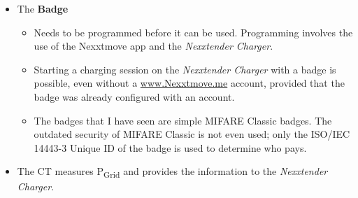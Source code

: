 \documentclass[a4paper]{article}
\begin{document}
\begin{itemize}
\begin{itemize}
\begin{itemize}
	      	      	\item
	      	      	      Requires an account
	      	      	\item
	      	      	      Controls the Nexxtmove app which in turn controls the
	      	      	      \emph{Nexxtender Charger}.
	      	      	\item
	      	      	      Receives all information about charging events on the
	      	      	      \emph{Nexxtender Charger}.
	      	      	\item
	      	      	      If the \emph{Nexxtender Charger} is provided by an employer to an employee, 
	      	      	      \href{http://www.nexttmove.me/}{www.Nexxtmove.me}
	      	      	      controls the refunding of the employee by the employer.
	      	      	\item
	      	      	      Several providers of chargers rebrand this website. 
	      	      	      For instance if your employer provided you with a \emph{Nexxtender Charger} via Q8, 
	      	      	      the Q8 electric website is actually \href{http://www.nexttmove.me/}{www.Nexxtmove.me}.
	      	      \end{itemize}
	      	\item
	      	      The \textbf{Badge}
	      	      
	      	      \begin{itemize}
	      	      	    
	      	      	\item
	      	      	      Needs to be programmed before it can be used. 
	      	      	      Programming involves the use of the Nexxtmove app and the \emph{Nexxtender Charger}.
	      	      	\item
	      	      	      Starting a charging session on the \emph{Nexxtender Charger}
	      	      	      with a badge is possible, 
	      	      	      even without a \href{http://www.Nexxtmove.me/}{www.Nexxtmove.me} account,
	      	      	      provided that the badge was already configured with an account.
	      	      	\item
	      	      	      The badges that I have seen are simple MIFARE Classic badges. 
	      	      	      The outdated security of MIFARE Classic is not even used; 
	      	      	      only the ISO/IEC 14443-3 Unique ID of the badge is used to determine who pays.
	      	      \end{itemize}
	      	\item
	      	      The CT measures P\textsubscript{Grid} and provides the information to
	      	      the \emph{Nexxtender Charger}.
	      \end{itemize}
\end{itemize}
\end{document}
